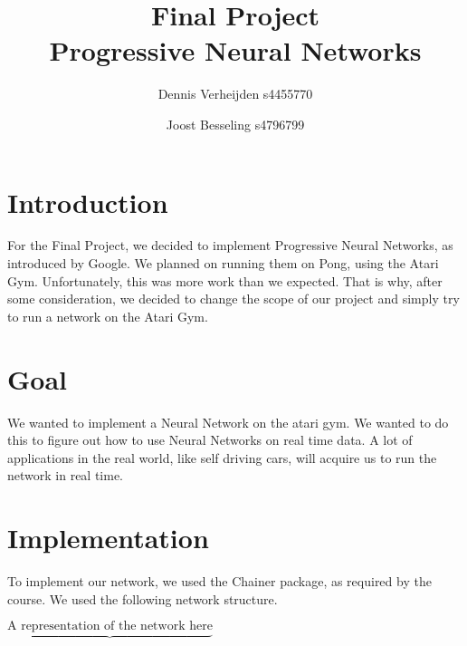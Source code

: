 \documentclass{article}
\title{Final Project \\ Progressive Neural Networks}
\author{Dennis Verheijden s4455770 \and Joost Besseling s4796799}
\begin{document}
\maketitle


\section*{Introduction}

For the Final Project, we decided to implement Progressive Neural Networks, as introduced by Google. We planned on running them on Pong, using the Atari Gym. Unfortunately, this was more work than we expected. That is why, after some consideration, we decided to change the scope of our project and simply try to run a network on the Atari Gym.
\section{Goal}

We wanted to implement a Neural Network on the atari gym. We wanted to do this to figure out how to use Neural Networks on real time data. A lot of applications in the real world, like self driving cars, will acquire us to run the network in real time.

\section{Implementation}

To implement our network, we used the Chainer package, as required by the course. We used the following network structure.

$\underbrace{\text{A representation of the network here}}$

\
\end{document}
